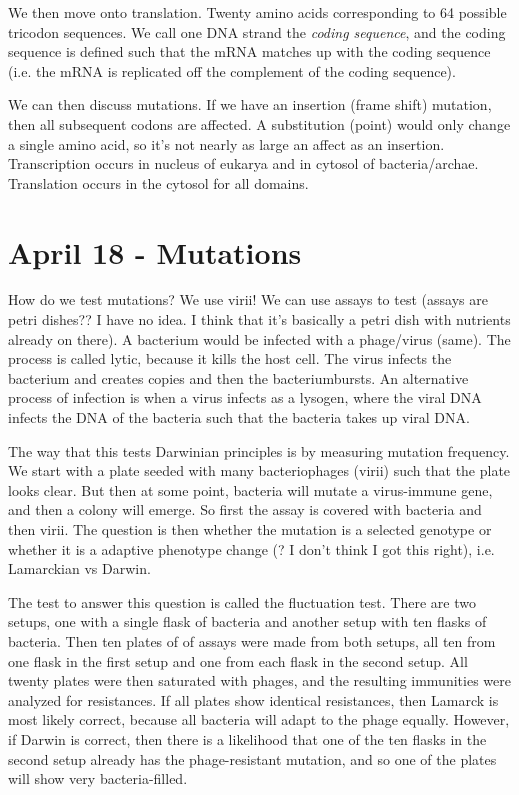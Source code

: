 \documentclass[12pt]{article}
\begin{document}
We then move onto translation. Twenty amino acids corresponding to 64 possible tricodon sequences. We call one DNA strand the \emph{coding sequence}, and the coding sequence is defined such that the mRNA matches up with the coding sequence (i.e. the mRNA is replicated off the complement of the coding sequence). 

We can then discuss mutations. If we have an insertion (frame shift) mutation, then all subsequent codons are affected. A substitution (point) would only change a single amino acid, so it's not nearly as large an affect as an insertion. Transcription occurs in nucleus of eukarya and in cytosol of bacteria/archae. Translation occurs in the cytosol for all domains. 
\section*{April 18 - Mutations}

How do we test mutations? We use virii! We can use assays to test (assays are petri dishes?? I have no idea. I think that it's basically a petri dish with nutrients already on there). A bacterium would be infected with a phage/virus (same). The process is called lytic, because it kills the host cell. The virus infects the bacterium and creates copies and then the bacteriumbursts. An alternative process of infection is when a virus infects as a lysogen, where the viral DNA infects the DNA of the bacteria such that the bacteria takes up viral DNA.

The way that this tests Darwinian principles is by measuring mutation frequency. We start with a plate seeded with many bacteriophages (virii) such that the plate looks clear. But then at some point, bacteria will mutate a virus-immune gene, and then a colony will emerge. So first the assay is covered with bacteria and then virii. The question is then whether the mutation is a selected genotype or whether it is a adaptive phenotype change (? I don't think I got this right), i.e. Lamarckian vs Darwin. 

The test to answer this question is called the fluctuation test. There are two setups, one with a single flask of bacteria and another setup with ten flasks of bacteria. Then ten plates of of assays were made from both setups, all ten from one flask in the first setup and one from each flask in the second setup. All twenty plates were then saturated with phages, and the resulting immunities were analyzed for resistances. If all plates show identical resistances, then Lamarck is most likely correct, because all bacteria will adapt to the phage equally. However, if Darwin is correct, then there is a likelihood that one of the ten flasks in the second setup already has the phage-resistant mutation, and so one of the plates will show very bacteria-filled.
\end{document}
